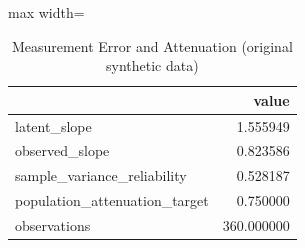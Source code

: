 \begin{table}[htbp]
\centering
\caption{Measurement Error and Attenuation (original synthetic data)}
\begingroup
\small
\setlength{\tabcolsep}{6pt}
\renewcommand{\arraystretch}{1.12}
\begin{adjustbox}{max width=\linewidth}
\begin{tabular}{@{}lr@{}}
\toprule
 & value \\
\midrule
latent\_slope & 1.555949 \\
observed\_slope & 0.823586 \\
sample\_variance\_reliability & 0.528187 \\
population\_attenuation\_target & 0.750000 \\
observations & 360.000000 \\
\bottomrule
\end{tabular}
\end{adjustbox}
\endgroup
\end{table}